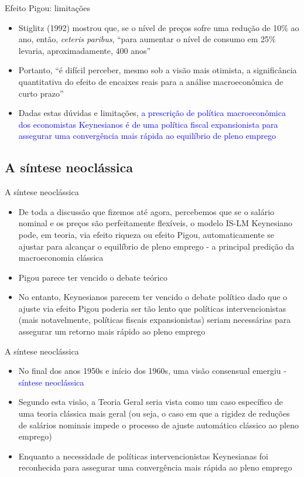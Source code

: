\documentclass[10pt]{beamer}
\begin{document}
\begin{frame}{Efeito Pigou: limitações}
    \begin{itemize}
        \item Stiglitz (1992) mostrou que, se o nível de preços sofre uma redução de 10\% ao ano, então, \emph{ceteris paribus}, ``para aumentar o nível de consumo em 25\% levaria, aproximadamente, 400 anos''
        \bigskip
        \item Portanto, ``é difícil perceber, mesmo sob a visão mais otimista, a significância quantitativa do efeito de encaixes reais para a análise macroeconômica de curto prazo''
        \bigskip
        \item Dadas estas dúvidas e limitações, \textcolor{blue}{a prescrição de política macroeconômica dos economistas Keynesianos é de uma política fiscal expansionista para assegurar uma convergência mais rápida ao equilíbrio de pleno emprego}
    \end{itemize}
\end{frame}

\subsection{A síntese neoclássica}
\begin{frame}{A síntese neoclássica}
    \begin{itemize}
        \item De toda a discussão que fizemos até agora, percebemos que se o salário nominal e os preços são perfeitamente flexíveis, o modelo IS-LM Keynesiano pode, em teoria, via efeito riqueza ou efeito Pigou, automaticamente se ajustar para alcançar o equilíbrio de pleno emprego - a principal predição da macroeconomia clássica
        \bigskip
        \item Pigou parece ter vencido o debate teórico
        \bigskip
        \item No entanto, Keynesianos parecem ter vencido o debate político dado que o ajuste via efeito Pigou poderia ser tão lento que políticas intervencionistas (mais notavelmente, políticas fiscais expansionistas) seriam necessárias para assegurar um retorno mais rápido ao pleno emprego
    \end{itemize}
\end{frame}

\begin{frame}{A síntese neoclássica}
    \begin{itemize}
        \item No final dos anos 1950s e início dos 1960s, uma visão consensual emergiu - \textcolor{blue}{síntese neoclássica}
        \bigskip
        \item Segundo esta visão, a Teoria Geral seria vista como um caso específico de uma teoria clássica mais geral (ou seja, o caso em que a rigidez de reduções de salários nominais impede o processo de ajuste automático clássico ao pleno emprego)
        \bigskip
        \item Enquanto a necessidade de políticas intervencionistas Keynesianas foi reconhecida para assegurar uma convergência mais rápida ao pleno emprego
    \end{itemize}
\end{frame}
\end{document}
